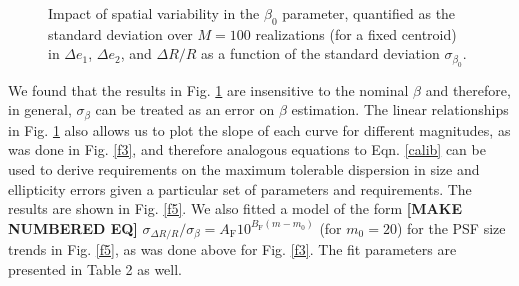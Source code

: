 \documentclass[11pt,preprint,flushrt]{aastex}
\begin{document}
\begin{figure}[!h]
\centering
{}
\caption{Impact of spatial variability in the $\beta_0$ parameter, quantified as the standard deviation over $M=100$ realizations (for a fixed centroid) in $\Delta e_1$,  $\Delta e_2$, and $\Delta R/R$  as a function of the standard deviation $ \sigma_{\beta_0}$. }
\label{f4}
\end{figure}
We found that the results in Fig. \ref{f4} are insensitive to the nominal $\beta$ and therefore, in general, $\sigma_{\beta}$  can be treated as an error on $\beta$ estimation. The linear relationships in Fig. \ref{f4} also allows us to plot the slope of each curve for different magnitudes, as was done in Fig. \ref{f3}, and therefore analogous equations to Eqn. \ref{calib} can be used to derive requirements on the maximum tolerable dispersion in size and ellipticity errors given a particular set of parameters and requirements. The results are shown in Fig. \ref{f5}. We also fitted a model of the form \textbf{[MAKE NUMBERED EQ]} $\sigma_{\Delta R/ R}/ \sigma_{\beta} = A_{\text{F}}10^{B_{\text{F}} (m - m_{0})}$ (for $m_0 =20$) for the PSF size trends in Fig. \ref{f5}, as was done above for Fig. \ref{f3}. The fit parameters are presented in Table 2 as well.  
\end{document}
